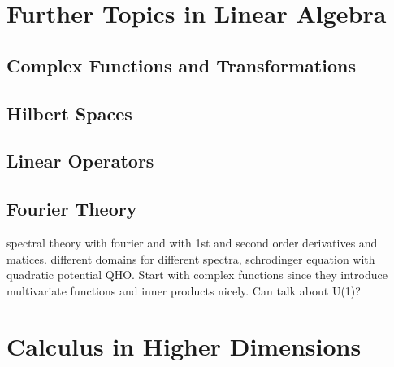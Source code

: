 \documentclass[12pt,letterpaper, openany]{book} %
\begin{document}
 
\frontmatter



%
 
\clearpage
\thispagestyle{empty}
 
\tableofcontents
 
\mainmatter

\setcounter{part}{4}
\part{Further Topics in Linear Algebra}

\chapter{Complex Functions and Transformations}
 

\chapter{Hilbert Spaces}


\chapter{Linear Operators}


\chapter{Fourier Theory}


spectral theory with fourier and with 1st and second order derivatives and matices. different domains for different spectra, schrodinger equation with quadratic potential QHO.  Start with complex functions since they introduce multivariate functions and inner products nicely. Can talk about U(1)?

\part{Calculus in Higher Dimensions}
\end{document}
